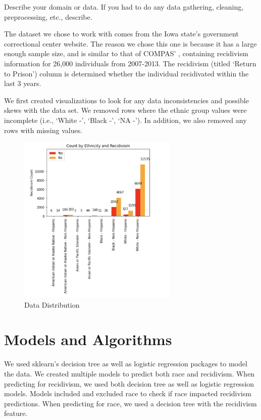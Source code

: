 \documentclass[11pt, sigconf]{acmart}
\begin{document}
Describe your domain or data. If you had to do any data gathering, cleaning, preprocessing, etc., describe.

The dataset we chose to work with comes from the Iowa state’s government correctional center website. The reason we chose this one is because it has a large enough sample size, and is similar to that of COMPAS' , containing recidivism information for 26,000 individuals from 2007-2013. The recidivism (titled ‘Return to Prison’) column is determined whether the individual recidivated within the last 3 years.

We first created visualizations to look for any data inconsistencies and possible skews with the data set. We removed rows where the ethnic group values were incomplete (i.e., ‘White -’, ‘Black -’, ‘NA -’). In addition, we also removed any rows with missing values.

\begin{figure}[h] 	
\centering
\includegraphics[width=3in]{1.png}
\caption{Data Distribution}
\end{figure}

\section{Models and Algorithms}

\hspace{5mm} We used sklearn’s decision tree as well as logistic regression packages to model the data. We created multiple models to predict both race and recidivism. When predicting for recidivism, we used both decision tree as well as logistic regression models. Models included and excluded race to check if race impacted recidivism predictions. When predicting for race, we used a decision tree with the recidivism feature.
\end{document}
